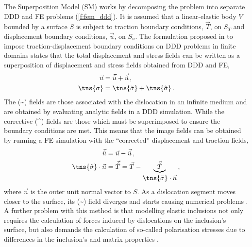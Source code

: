 The Superposition Model (SM) works by decomposing the problem into separate DDD and FE problems (\cref{f:fem_ddd}). It is assumed that a linear-elastic body $ V $ bounded by a surface $ S $ is subject to traction boundary conditions, $ \vec{T} $, on $ S_{T} $ and displacement boundary conditions, $ \vec{u} $, on $ S_{u} $. The formulation proposed in \cite{dismot} to impose traction-displacement boundary conditions on DDD problems in finite domains states that the total displacement and stress fields can be written as a superposition of displacement and stress fields obtained from DDD and FE,
\begin{subequations}
    \label{eq:superposition}
    \begin{align}
        \vec{u}      & = \vec{\tilde{u}} + \vec{\hat{u}}\,,            \\
        \tns{\sigma} & = \tns{\tilde{\sigma}} + \tns{\hat{\sigma}}\, .
    \end{align}
\end{subequations}
The (\textasciitilde) fields are those associated with the dislocation in an infinite medium and are obtained by evaluating analytic fields in a DDD simulation. While the corrective (\textasciicircum) fields are those which must be superimposed to ensure the boundary conditions are met. This means that the image fields can be obtained by running a FE simulation with the ``corrected'' displacement and traction fields,
\begin{subequations}
    \begin{align}
        \vec{\hat{u}}                    & = \vec{u} - \vec{\tilde{u}}\,,                                                                                 \\
        \tns{\hat{\sigma}} \cdot \vec{n} & = \vec{\hat{T}} = \vec{T} - \underbrace{\vec{\tilde{T}}}_{\displaystyle{\tns{\tilde{\sigma}}}\cdot \vec{n}}\,,
    \end{align}
\end{subequations}
where $ \vec{n} $ is the outer unit normal vector to $ S $. As a dislocation segment moves closer to the surface, its (\textasciitilde) field diverges and starts causing numerical problems \cite{bdd}. A further problem with this method is that modelling elastic inclusions not only requires the calculation of forces induced by dislocations on the inclusion's surface, but also demands the calculation of so-called polarisation stresses due to differences in the inclusion's and matrix properties \cite{dismot, bdd, ddd_precip}.

